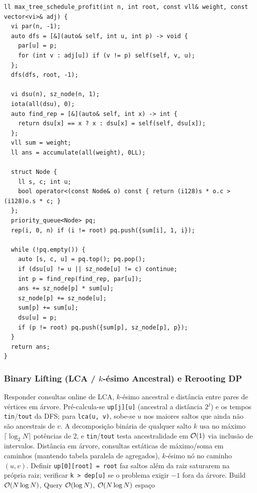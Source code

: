 \begin{lstlisting}
ll max_tree_schedule_profit(int n, int root, const vll& weight, const vector<vi>& adj) {
  vi par(n, -1);
  auto dfs = [&](auto& self, int u, int p) -> void {
    par[u] = p;
    for (int v : adj[u]) if (v != p) self(self, v, u);
  };
  dfs(dfs, root, -1);

  vi dsu(n), sz_node(n, 1);
  iota(all(dsu), 0);
  auto find_rep = [&](auto& self, int x) -> int {
    return dsu[x] == x ? x : dsu[x] = self(self, dsu[x]);
  };
  vll sum = weight;
  ll ans = accumulate(all(weight), 0LL);

  struct Node {
    ll s, c; int u;
    bool operator<(const Node& o) const { return (i128)s * o.c > (i128)o.s * c; }
  };
  priority_queue<Node> pq;
  rep(i, 0, n) if (i != root) pq.push({sum[i], 1, i});

  while (!pq.empty()) {
    auto [s, c, u] = pq.top(); pq.pop();
    if (dsu[u] != u || sz_node[u] != c) continue;
    int p = find_rep(find_rep, par[u]);
    ans += sz_node[p] * sum[u];
    sz_node[p] += sz_node[u];
    sum[p] += sum[u];
    dsu[u] = p;
    if (p != root) pq.push({sum[p], sz_node[p], p});
  }
  return ans;
}
\end{lstlisting}

\subsubsection{Binary Lifting (LCA / $k$-ésimo Ancestral) e Rerooting DP}
\algobox
  {Responder consultas online de LCA, $k$-ésimo ancestral e distância entre pares de vértices em árvore.}
  {Pré-calcula-se \texttt{up[j][u]} (ancestral a distância $2^j$) e os tempos \texttt{tin}/\texttt{tout} da DFS; para \texttt{lca(u, v)}, sobe-se $u$ nos maiores saltos que ainda não são ancestrais de $v$.}
  {A decomposição binária de qualquer salto $k$ usa no máximo $\lceil \log_2 N \rceil$ potências de 2, e \texttt{tin}/\texttt{tout} testa ancestralidade em $\mathcal{O}(1)$ via inclusão de intervalos.}
  {Distância em árvore, consultas estáticas de máximo/soma em caminhos (mantendo tabela paralela de agregados), $k$-ésimo nó no caminho $(u, v)$.}
  {Definir \texttt{up[0][root] = root} faz saltos além da raiz saturarem na própria raiz; verificar \texttt{k > dep[u]} se o problema exigir $-1$ fora da árvore.}
  {Build $\mathcal{O}(N \log N)$, Query $\mathcal{O}(\log N)$, $\mathcal{O}(N \log N)$ espaço}

